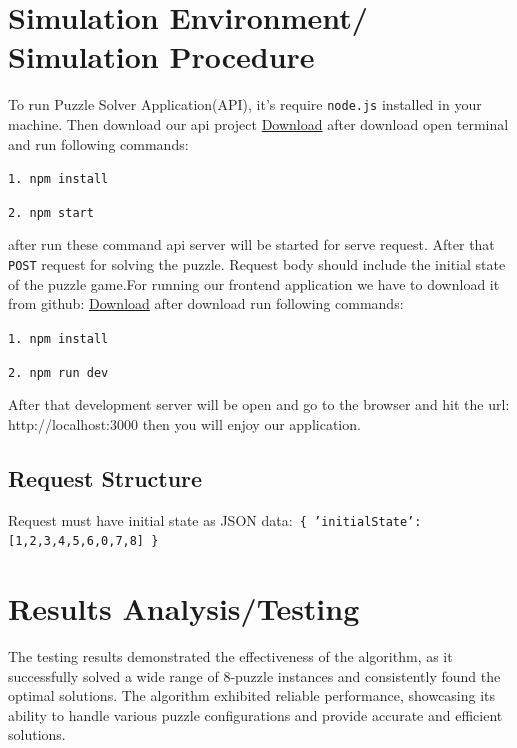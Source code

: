 \documentclass[12pt]{report}
\begin{document}
\section{Simulation Environment/ Simulation Procedure}
To run Puzzle Solver Application(API), it's require \texttt{node.js} installed in your machine. Then download our api project \href{https://github.com/rajurayhan37/puzzle-solver-api}{Download} after download open terminal and run following commands:
\begin{center}
\texttt{1. npm install}
\end{center}
\begin{center}
    \texttt{2. npm start}
\end{center}
after run these command api server will be started for serve request. After that \texttt{POST} request for solving the puzzle. Request body should include the initial state of the puzzle game.\newline For running our frontend application we have to download it from github: \href{https://github.com/rajurayhan37/puzzle-solver}{Download} after download run following commands:
\begin{center}
\texttt{1. npm install}
\end{center}
\begin{center}
    \texttt{2. npm run dev}
\end{center}
After that development server will be open and go to the browser and hit the url: http://localhost:3000 then you will enjoy our application.

\subsection{Request Structure}
Request must have initial state as JSON data:\newline\newline \texttt{
\{
    'initialState': [1,2,3,4,5,6,0,7,8]
\}
}

\section{Results Analysis/Testing}

The testing results demonstrated the effectiveness of the algorithm, as it successfully solved a wide range of 8-puzzle instances and consistently found the optimal solutions. The algorithm exhibited reliable performance, showcasing its ability to handle various puzzle configurations and provide accurate and efficient solutions.
\end{document}
